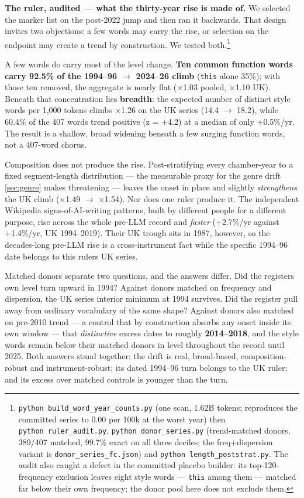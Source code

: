 \textbf{The ruler, audited --- what the thirty-year rise is made of.} We selected the marker list on the post-2022 jump and then ran it backwards. That design invites two objections: a few words may carry the rise, or selection on the endpoint may create a trend by construction. We tested both.\footnote{\texttt{python\ build\_\allowbreak{}word\_\allowbreak{}year\_\allowbreak{}counts.\allowbreak{}py} (one scan, 1.62B tokens;
  reproduces the committed series to 0.00 per 100k at the worst year)
  then \texttt{python\ ruler\_audit.py}, \texttt{python\ donor\_series.py} (trend-matched
  donors, 389/407 matched, 99.7\% exact on all three deciles; the
  freq+dispersion variant is \texttt{donor\_series\_fc.json}) and
  \texttt{python\ length\_\allowbreak{}poststrat.\allowbreak{}py}. The audit also caught a defect in the
  committed placebo builder: its top-120-frequency exclusion leaves
  eight style words --- \texttt{this} among them --- matched far below their own
  frequency; the donor pool here does not exclude them.}

A few words do carry most of the level change. \textbf{Ten common function words carry 92.5\% of the 1994--96 \(\rightarrow\) 2024--26 climb} (\texttt{this} alone 35\%); with those ten removed, the aggregate is nearly flat (\(\times\)1.03 pooled, \(\times\)1.10 UK). Beneath that concentration lies \textbf{breadth}: the expected number of distinct style words per 1,000 tokens climbs \(\times\)1.26 on the UK series (14.4 \(\rightarrow\) 18.2), while 60.4\% of the 407 words trend positive (z = +4.2) at a median of only +0.5\%/yr. The result is a shallow, broad widening beneath a few surging function words, not a 407-word chorus.

Composition does not produce the rise. Post-stratifying every chamber-year to a fixed segment-length distribution --- the measurable proxy for the genre drift \cref{sec:genre} makes threatening --- leaves the onset in place and slightly \emph{strengthens} the UK climb (\(\times\)1.49 \(\rightarrow\) \(\times\)1.54). Nor does one ruler produce it. The independent Wikipedia signs-of-AI-writing patterns, built by different people for a different purpose, rise across the whole pre-LLM record and \emph{faster} (+2.7\%/yr against +1.4\%/yr, UK 1994--2019). Their UK trough sits in 1987, however, so the decades-long pre-LLM rise is a cross-instrument fact while the specific 1994--96 date belongs to this ruler\textquotesingle s UK series.

Matched donors separate two questions, and the answers differ. Did the register\textquotesingle s own level turn upward in 1994? Against donors matched on frequency and dispersion, the UK series\textquotesingle{} interior minimum at 1994 survives. Did the register pull away from ordinary vocabulary of the same shape? Against donors also matched on pre-2010 trend --- a control that by construction absorbs any onset inside its own window --- that \emph{distinctive} excess dates to roughly \textbf{2014--2018}, and the style words remain below their matched donors in level throughout the record until 2025. Both answers stand together: the drift is real, broad-based, composition-robust and instrument-robust; its dated 1994--96 turn belongs to the UK ruler; and its excess over matched controls is younger than the turn.

